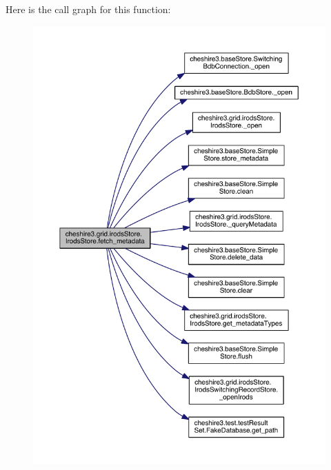Here is the call graph for this function\-:
\nopagebreak
\begin{figure}[H]
\begin{center}
\leavevmode
\includegraphics[width=350pt]{classcheshire3_1_1grid_1_1irods_store_1_1_irods_store_a492bee0f6d9081cba0a49f3514f241e8_cgraph}
\end{center}
\end{figure}


